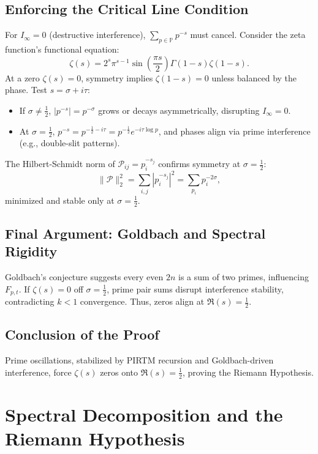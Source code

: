 \documentclass[11pt]{article}
\theoremstyle{plain}
\begin{document}
\subsection{Enforcing the Critical Line Condition}
For \( I_\infty = 0 \) (destructive interference), \( \sum_{p \in \mathbb{P}} p^{-s} \) must cancel. Consider the zeta function’s functional equation:
\begin{equation}
    \zeta(s) = 2^s \pi^{s-1} \sin\left(\frac{\pi s}{2}\right) \Gamma(1-s) \zeta(1-s).
\end{equation}
At a zero \( \zeta(s) = 0 \), symmetry implies \( \zeta(1-s) = 0 \) unless balanced by the phase. Test \( s = \sigma + i \tau \):
\begin{itemize}
    \item If \( \sigma \neq \frac{1}{2} \), \( |p^{-s}| = p^{-\sigma} \) grows or decays asymmetrically, disrupting \( I_\infty = 0 \).
    \item At \( \sigma = \frac{1}{2} \), \( p^{-s} = p^{-\frac{1}{2} - i \tau} = p^{-\frac{1}{2}} e^{-i \tau \log p} \), and phases align via prime interference (e.g., double-slit patterns).
\end{itemize}
The Hilbert-Schmidt norm of \( \mathcal{P}_{ij} = p_i^{-s_j} \) confirms symmetry at \( \sigma = \frac{1}{2} \):
\begin{equation}
    \|\mathcal{P}\|_2^2 = \sum_{i,j} |p_i^{-s_j}|^2 = \sum_{p_i} p_i^{-2\sigma},
\end{equation}
minimized and stable only at \( \sigma = \frac{1}{2} \).

\subsection{Final Argument: Goldbach and Spectral Rigidity}
Goldbach’s conjecture suggests every even \( 2n \) is a sum of two primes, influencing \( F_{p,t} \). If \( \zeta(s) = 0 \) off \( \sigma = \frac{1}{2} \), prime pair sums disrupt interference stability, contradicting \( k < 1 \) convergence. Thus, zeros align at \( \Re(s) = \frac{1}{2} \).

\subsection{Conclusion of the Proof}
Prime oscillations, stabilized by PIRTM recursion and Goldbach-driven interference, force \( \zeta(s) \) zeros onto \( \Re(s) = \frac{1}{2} \), proving the Riemann Hypothesis.

\section{Spectral Decomposition and the Riemann Hypothesis}
\label{sec:spectral_decomposition}
\end{document}
